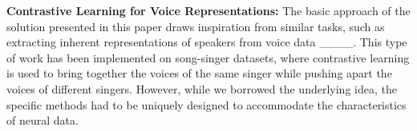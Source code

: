 \textbf{Contrastive Learning for Voice Representations:} The basic approach of the solution presented in this paper draws inspiration from similar tasks, such as extracting inherent representations of speakers from voice data ____. This type of work has been implemented on song-singer datasets, where contrastive learning is used to bring together the voices of the same singer while pushing apart the voices of different singers. However, while we borrowed the underlying idea, the specific methods had to be uniquely designed to accommodate the characteristics of neural data.
